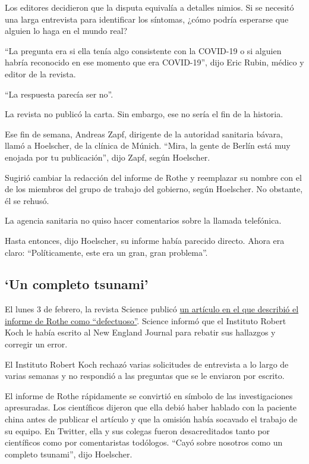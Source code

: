 Los editores decidieron que la disputa equivalía a detalles nimios. Si
se necesitó una larga entrevista para identificar los síntomas, ¿cómo
podría esperarse que alguien lo haga en el mundo real?

``La pregunta era si ella tenía algo consistente con la COVID-19 o si
alguien habría reconocido en ese momento que era COVID-19'', dijo Eric
Rubin, médico y editor de la revista.

``La respuesta parecía ser no''.

La revista no publicó la carta. Sin embargo, ese no sería el fin de la
historia.

Ese fin de semana, Andreas Zapf, dirigente de la autoridad sanitaria
bávara, llamó a Hoelscher, de la clínica de Múnich. ``Mira, la gente de
Berlín está muy enojada por tu publicación'', dijo Zapf, según
Hoelscher.

Sugirió cambiar la redacción del informe de Rothe y reemplazar su nombre
con el de los miembros del grupo de trabajo del gobierno, según
Hoelscher. No obstante, él se rehusó.

La agencia sanitaria no quiso hacer comentarios sobre la llamada
telefónica.

Hasta entonces, dijo Hoelscher, su informe había parecido directo. Ahora
era claro: ``Políticamente, este era un gran, gran problema''.

\hypertarget{un-completo-tsunami}{%
\subsection{`Un completo tsunami'}\label{un-completo-tsunami}}

El lunes 3 de febrero, la revista Science publicó
\href{https://www.sciencemag.org/news/2020/02/paper-non-symptomatic-patient-transmitting-coronavirus-wrong}{un
artículo en el que describió el informe de Rothe como ``defectuoso''}.
Science informó que el Instituto Robert Koch le había escrito al New
England Journal para rebatir sus hallazgos y corregir un error.

El Instituto Robert Koch rechazó varias solicitudes de entrevista a lo
largo de varias semanas y no respondió a las preguntas que se le
enviaron por escrito.

El informe de Rothe rápidamente se convirtió en símbolo de las
investigaciones apresuradas. Los científicos dijeron que ella debió
haber hablado con la paciente china antes de publicar el artículo y que
la omisión había socavado el trabajo de su equipo. En Twitter, ella y
sus colegas fueron desacreditados tanto por científicos como por
comentaristas todólogos. ``Cayó sobre nosotros como un completo
tsunami'', dijo Hoelscher.

